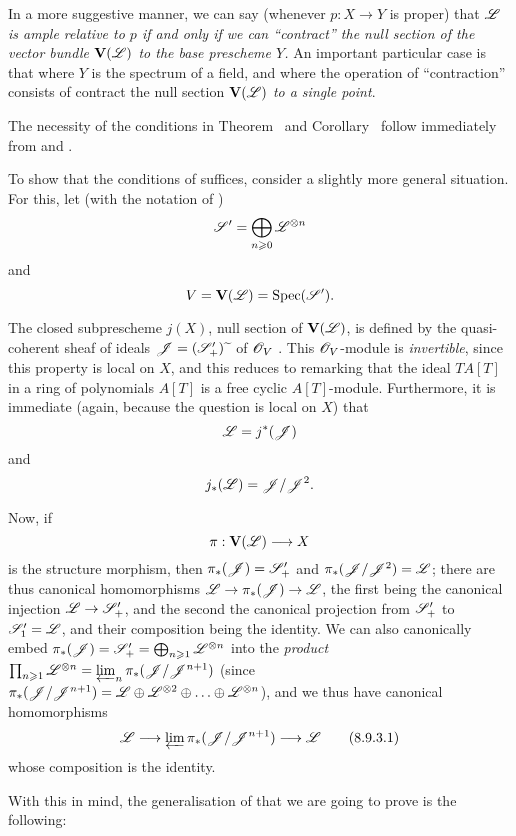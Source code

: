 In a more suggestive manner, we can say (whenever $p:X\to Y$ is proper) that \emph{$\mathscr{L}$ is ample relative to $p$ if and only if we can ``\emph{contract}'' the null section of the vector bundle $\mathbf{V}(\mathscr{L})$ to the base prescheme $Y$.}
An important particular case is that where $Y$ is the spectrum of a field, and where the operation of ``contraction'' consists of contract the null section $\mathbf{V}(\mathscr{L})$ \emph{to a single point}.

\begin{env}[8.9.3]
\label{II.8.9.3}
The necessity of the conditions in Theorem~ and Corollary~ follow immediately from  and .

To show that the conditions of  suffices, consider a slightly more general situation.
For this, let (with the notation of )
\[
  \mathscr{S}'=\bigoplus_{n\geqslant 0}\mathscr{L}^{\otimes n}
\]
and
\[
  V=\mathbf{V}(\mathscr{L})=\operatorname{Spec}(\mathscr{S}').
\]

The closed subprescheme $j(X)$, null section of $\mathbf{V}(\mathscr{L})$, is defined by the quasi-coherent sheaf of ideals $\mathscr{J}=(\mathscr{S}'_+){\,\widetilde{\,}\,}$ of $\mathscr{O}_V$ .
This $\mathscr{O}_V$-module is \emph{invertible}, since this property is local on $X$, and this reduces to remarking that the ideal $TA[T]$ in a ring of polynomials $A[T]$ is a free cyclic $A[T]$-module.
Furthermore, it is immediate (again, because the question is local on $X$) that
\[
  \mathscr{L}=j^*(\mathscr{J})
\]
and
\[
  j_*(\mathscr{L})=\mathscr{J}/\mathscr{J}^2.
\]

Now, if
\[
  \pi:\bb{V}(\sh{L})\to X
\]
is the structure morphism, then $\pi_*(\mathscr{J})=\mathscr{S}'_+$ and $\pi_*(\mathscr{J}/\mathscr{J}^2)=\mathscr{L}$;
there are thus canonical homomorphisms $\sh{L}\to\pi_*(\sh{J})\to\sh{L}$, the first being the canonical injection $\sh{L}\to\sh{S}'_+$, and the second the canonical projection from $\mathscr{S}'_+$ to $\mathscr{S}'_1=\mathscr{L}$, and their composition being the identity.
We can also canonically embed $\pi_*(\mathscr{J}) = \mathscr{S}'_+ = \bigoplus_{n\geqslant1}\mathscr{L}^{\otimes n}$ into the \emph{product} $\prod_{n\geqslant1}\mathscr{L}^{\otimes n} = \varprojlim_n \pi_*(\mathscr{J}/\mathscr{J}^{n+1})$ (since $\pi_*(\mathscr{J}/\mathscr{J}^{n+1}) = \mathscr{L}\oplus\mathscr{L}^{\otimes 2}\oplus\ldots\oplus\mathscr{L}^{\otimes n}$), and we thus have canonical homomorphisms
\[
\label{II.8.9.3.1}
  \sh{L}\to\varprojlim\pi_*(\sh{J}/\sh{J}^{n+1})\to\sh{L}
  \tag{8.9.3.1}
\]
whose composition is the identity.

With this in mind, the generalisation of  that we are going to prove is the following:
\end{env}

